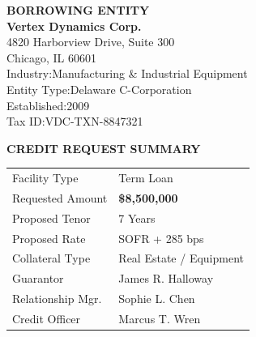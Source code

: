 \documentclass[11pt,a4paper]{article}
\begin{document}
\begin{tcolorbox}[
  enhanced, arc=4pt,
  colback=white, colframe=NavyInk,
  boxrule=1pt,
  top=10pt, bottom=10pt, left=12pt, right=12pt,
  drop shadow={NavyInk!25}
]
  \begin{minipage}[t]{0.48\textwidth}
    \vspace{0pt}
    {\color{SlateGray}\scriptsize\bfseries BORROWING ENTITY}\\[3pt]
    {\color{NavyInk}\Large\bfseries Vertex Dynamics Corp.}\\[2pt]
    {\color{SlateGray}\small 4820 Harborview Drive, Suite 300}\\
    {\color{SlateGray}\small Chicago, IL 60601}\\[4pt]
    {\color{SlateGray}\scriptsize Industry:\enspace}{\small Manufacturing \& Industrial Equipment}\\
    {\color{SlateGray}\scriptsize Entity Type:\enspace}{\small Delaware C-Corporation}\\
    {\color{SlateGray}\scriptsize Established:\enspace}{\small 2009}\\
    {\color{SlateGray}\scriptsize Tax ID:\enspace}{\small VDC-TXN-8847321}
  \end{minipage}%
  \hfill
  \vrule width 0.5pt height 70pt depth 0pt \relax
  \hfill
  \begin{minipage}[t]{0.46\textwidth}
    \vspace{0pt}
    {\color{SlateGray}\scriptsize\bfseries CREDIT REQUEST SUMMARY}\\[3pt]
    \begin{tabularx}{\linewidth}{@{}L{3.2cm} R{2.5cm}@{}}
      Facility Type        & Term Loan \\
      Requested Amount     & \textbf{\$8,500,000} \\
      Proposed Tenor       & 7 Years \\
      Proposed Rate        & SOFR + 285 bps \\
      Collateral Type      & Real Estate / Equipment \\
      Guarantor            & James R. Halloway \\
      Relationship Mgr.    & Sophie L. Chen \\
      Credit Officer       & Marcus T. Wren \\
    \end{tabularx}
  \end{minipage}
\end{tcolorbox}
\end{document}
